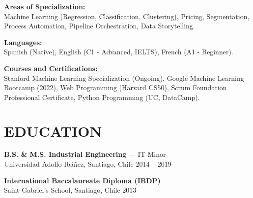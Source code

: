 \documentclass[a4paper,10.5pt]{extarticle}
\begin{document}
\vspace{4pt}

\textbf{Areas of Specialization:}\\
Machine Learning (Regression, Classification, Clustering), Pricing, Segmentation, Process Automation, Pipeline Orchestration, Data Storytelling.

\vspace{4pt}

\textbf{Languages:}\\
Spanish (Native), English (C1 - Advanced, IELTS), French (A1 - Beginner).

\vspace{4pt}

\textbf{Courses and Certifications:}\\
Stanford Machine Learning Specialization (Ongoing), Google Machine Learning Bootcamp (2022), Web Programming (Harvard CS50), Scrum Foundation Professional Certificate, Python Programming (UC, DataCamp).

\section*{EDUCATION}

\textbf{B.S. \& M.S. Industrial Engineering} --- IT Minor\\
Universidad Adolfo Ibáñez, Santiago, Chile \hfill 2014 -- 2019

\vspace{6pt}

\textbf{International Baccalaureate Diploma (IBDP)}\\
Saint Gabriel's School, Santiago, Chile \hfill 2013
\end{document}
